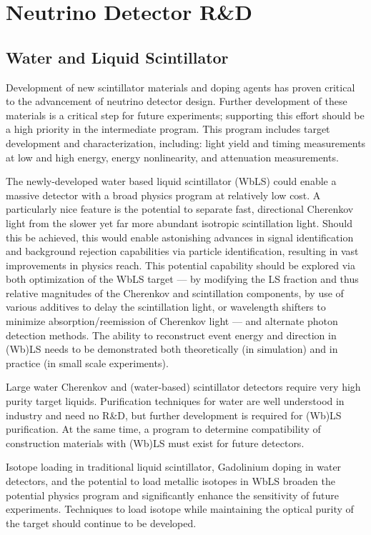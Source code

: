 \section{Neutrino Detector R\&D}
\label{sec:RandD}

\subsection{Water and Liquid Scintillator}

Development of new scintillator materials and doping agents has proven critical to the advancement 
of neutrino detector design. Further development of these materials is a critical step for future 
experiments; supporting this effort should be a high priority in the intermediate program. This program 
includes target development and characterization, including: light yield and timing measurements at 
low and high energy, energy nonlinearity, and attenuation measurements.

The newly-developed water based liquid scintillator (WbLS) could enable a massive detector with a 
broad physics program at relatively low cost. A particularly nice feature is the potential to separate fast, 
directional Cherenkov light from the slower yet far more abundant isotropic scintillation light. Should this 
be achieved, this would enable astonishing advances in signal identification and background rejection 
capabilities via particle identification, resulting in vast improvements in physics reach. This potential 
capability should be explored via both optimization of the WbLS target --- by modifying the LS fraction 
and thus relative magnitudes of the Cherenkov and scintillation components, by use of various additives 
to delay the scintillation light, or wavelength shifters to minimize absorption/reemission of Cherenkov 
light --- and alternate photon detection methods. The ability to reconstruct event energy and direction in 
(Wb)LS needs to be demonstrated both theoretically (in simulation) and in practice (in small scale 
experiments).

Large water Cherenkov and (water-based) scintillator detectors require very high purity target liquids. 
Purification techniques for water are well understood in industry and need no R\&D, but further 
development is required for (Wb)LS purification. At the same time, a program to determine compatibility 
of construction materials with (Wb)LS must exist for future detectors.

Isotope loading in traditional liquid scintillator, Gadolinium doping in water detectors, and the potential 
to load metallic isotopes in WbLS broaden the potential physics program and significantly enhance the 
sensitivity of future experiments. Techniques to load isotope while maintaining the optical purity of the 
target should continue to be developed.

